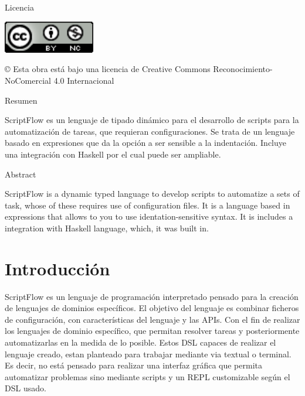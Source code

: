 \documentclass[11pt]{article}
\begin{document}
\newpage
\begin{flushleft}
  {\huge  Licencia }\\[2ex]
\end{flushleft}

\begin{center}
  \includegraphics[width=40mm]{license.png}\\[4ex]
\end{center}
© Esta obra está bajo una licencia de Creative Commons Reconocimiento-NoComercial 4.0 Internacional

\newpage
\begin{center}
  {\huge  Resumen }\\[2ex]
\end{center}

{\fontsize{14}{11}\selectfont
   ScriptFlow es un lenguaje de tipado dinámico para el desarrollo de scripts para la automatización de tareas, que requieran configuraciones.
   Se trata de un lenguaje basado en expresiones que da la opción a ser sensible a la indentación. Incluye una integración con Haskell por el
   cual puede ser ampliable.
}

\newpage
\begin{center}
  {\huge  Abstract }\\[2ex]
\end{center}

{\fontsize{14}{11}\selectfont
   ScriptFlow is a dynamic typed language to develop scripts to automatize a sets of task, whose of these requires use of configuration files.
   It is a language based in expressions that allows to you to use identation-sensitive syntax. It is includes a integration with Haskell language,
   which, it was built in.
}

\newpage

\renewcommand{\contentsname}{Índice general}

\tableofcontents

\newpage


\section{Introducción}
\label{sec:org9408cb6}

ScriptFlow es un lenguaje de programación interpretado pensado para la creación de lenguajes de dominios específicos. El objetivo del
lenguaje es combinar ficheros de configuración, con características del lenguaje y las APIs. Con el fin de realizar los lenguajes de dominio específico,
que permitan resolver tareas y posteriormente automatizarlas en la medida de lo posible. Estos DSL capaces de realizar el lenguaje creado, estan planteado
para trabajar mediante via textual o terminal. Es decir, no está pensado para realizar una interfaz gráfica que permita automatizar problemas sino mediante
scripts y un REPL customizable según el DSL usado.
\end{document}
